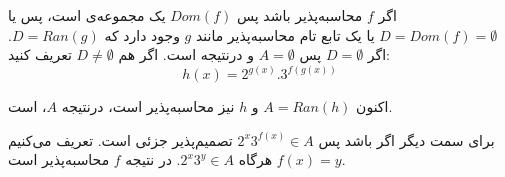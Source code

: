 اگر $f$ محاسبه‌پذیر باشد
پس $Dom(f)$ یک مجموعه‌ی  است، پس یا 
$D=Dom(f)=\emptyset$
یا
یک تابع تام محاسبه‌پذیر مانند $g$ وجود دارد که $D = Ran(g)$.
اگر $D=\emptyset$ پس $A=\emptyset$ و درنتیجه  است. اگر هم $D \neq \emptyset$ تعریف کنید:
$$
h(x) = 2^{g(x)}.3^{f(g(x))}
$$

اکنون $A = Ran(h)$ و $h$ نیز محاسبه‌پذیر است، درنتیجه $A$،  است.


\vspace{5mm}

برای سمت دیگر اگر   باشد پس 
$2^x3^{f(x)} \in A$
تصمیم‌پذیر جزئی است. تعریف می‌کنیم $f(x) = y$
هرگاه
$2^x3^y\in A$.
در نتیجه $f$
محاسبه‌پذیر است.